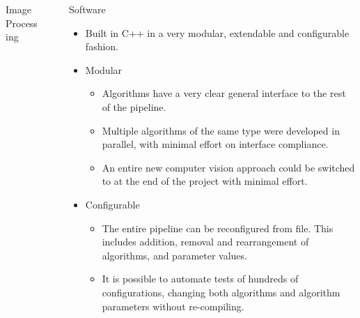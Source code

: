 \documentclass[final,hyperref={pdfpagelabels=false}]{beamer}
\begin{document}
\begin{frame}[t]
\begin{columns}[t]
\begin{column}{.465\textwidth}
\begin{block}{Image Processing}
\end{block}



\end{column} %

\begin{column}{.03\textwidth}\end{column} %
 
\begin{column}{.465\textwidth} %






\begin{block}{Software}
\begin{itemize}
	\item Built in C++ in a very modular, extendable and configurable fashion.
\end{itemize}
	\begin{itemize}
		\item Modular
		\begin{itemize}
			\item Algorithms have a very clear general interface to the rest of the pipeline.
			\item Multiple algorithms of the same type were developed in parallel, with minimal effort on interface compliance.
			\item An entire new computer vision approach could be switched to at the end of the project with minimal effort.
		\end{itemize}
	\end{itemize}
	\begin{itemize}
		\item Configurable
	\begin{itemize}
		\item The entire pipeline can be reconfigured from file. This includes addition, removal and rearrangement of algorithms, and parameter values.
		\item It is possible to automate tests of hundreds of configurations, changing both algorithms and algorithm parameters without re-compiling.
	\end{itemize}
\end{itemize}
\end{block}


\end{column}
\end{columns}
\end{frame}
\end{document}
